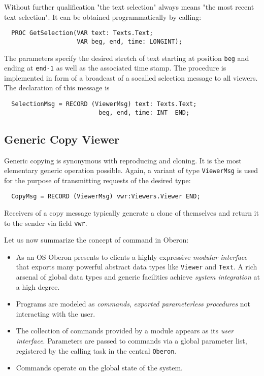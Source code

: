 Without further qualification "the text selection" always means "the most recent text selection".
It can be obtained programmatically by calling:
\begin{verbatim}
  PROC GetSelection(VAR text: Texts.Text;
                    VAR beg, end, time: LONGINT);
\end{verbatim}
The parameters specify the desired stretch of text starting at position \verb|beg| and ending
at \verb|end-1| as well as the associated time stamp. The procedure is implemented in form of
a broadcast of a socalled selection message to all viewers. The declaration of this message is
\begin{verbatim}
  SelectionMsg = RECORD (ViewerMsg) text: Texts.Text;
                          beg, end, time: INT  END;
\end{verbatim}

\subsection{Generic Copy Viewer}
Generic copying is synonymous with reproducing and cloning. It is the most elementary
generic operation possible. Again, a variant of type \verb|ViewerMsg| is used
for the purpose of transmitting requests of the desired type:
\begin{verbatim}
  CopyMsg = RECORD (ViewerMsg) vwr:Viewers.Viewer END;
\end{verbatim}
Receivers of a copy message typically generate a clone of themselves
and return it to the sender via field \verb|vwr|.

Let us now summarize the concept of command in Oberon:
\begin{itemize}
  \item As an OS Oberon presents to clients a highly expressive \emph{modular interface}
    that exports many powerful abstract data types like \verb|Viewer| and \verb|Text|.
    A rich arsenal of global data types and generic facilities achieve
    \emph{system integration} at a high degree.
  \item Programs are modeled as \emph{commands},
    \emph{exported parameterless procedures} not interacting with the user.
  \item The collection of commands provided by a module appears as its \emph{user interface}.
    Parameters are passed to commands via a global parameter list,
    registered by the calling task in the central \verb|Oberon|.
  \item Commands operate on the global state of the system.
\end{itemize}

